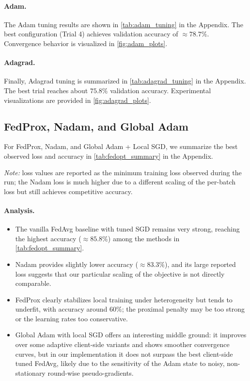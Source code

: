 \documentclass[10pt,twocolumn,letterpaper]{article}
\begin{document}
    \paragraph{Adam.}
    The Adam tuning results are shown in \cref{tab:adam_tuning} in the Appendix.
    The best configuration (Trial 4) achieves validation accuracy of
    $\approx 78.7\%$.
    Convergence behavior is visualized in \cref{fig:adam_plots}.

    \paragraph{Adagrad.}
    Finally, Adagrad tuning is summarized in \cref{tab:adagrad_tuning} in the Appendix.
    The best trial reaches about $75.8\%$ validation accuracy.
    Experimental visualizations are provided in \cref{fig:adagrad_plots}.

    \subsection{FedProx, Nadam, and Global Adam}

    For FedProx, Nadam, and Global Adam + Local SGD, we summarize the best
    observed loss and accuracy in \cref{tab:fedopt_summary} in the Appendix.

    \noindent\textit{Note:} loss values are reported as the minimum training
    loss observed during the run; the Nadam loss is much higher due to a
    different scaling of the per-batch loss but still achieves competitive
    accuracy.

    \paragraph{Analysis.}
    \begin{itemize}
        \item The vanilla FedAvg baseline with tuned SGD remains very strong,
        reaching the highest accuracy ($\approx 85.8\%$) among the methods
        in \cref{tab:fedopt_summary}.
        \item Nadam provides slightly lower accuracy ($\approx 83.3\%$), and
        its large reported loss suggests that our particular scaling of the
        objective is not directly comparable.
        \item FedProx clearly stabilizes local training under heterogeneity
        but tends to underfit, with accuracy around $60\%$; the proximal
        penalty may be too strong or the learning rates too conservative.
        \item Global Adam with local SGD offers an interesting middle ground:
        it improves over some adaptive client-side variants and shows
        smoother convergence curves, but in our implementation it does not
        surpass the best client-side tuned FedAvg, likely due to the
        sensitivity of the Adam state to noisy, non-stationary round-wise
        pseudo-gradients.
    \end{itemize}
\end{document}
